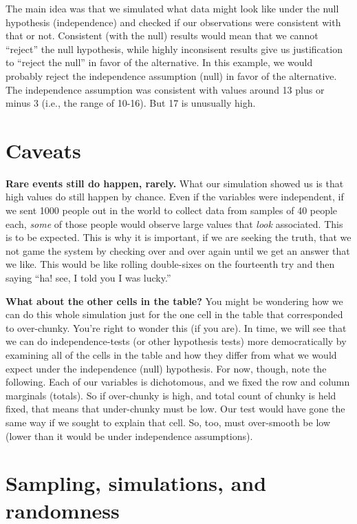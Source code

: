 \documentclass[openany]{book}
\begin{document}
The main idea was that we simulated what data might look like under the null hypothesis (independence) and checked if our observations were consistent with that or not. Consistent (with the null) results would mean that we cannot ``reject'' the null hypothesis, while highly inconsisent results give us justification to ``reject the null'' in favor of the alternative. In this example, we would probably reject the independence assumption (null) in favor of the alternative. The independence assumption was consistent with values around 13 plus or minus 3 (i.e., the range of 10-16). But 17 is unusually high.

\hypertarget{caveats}{%
\section*{Caveats}\label{caveats}}

\textbf{Rare events still do happen, rarely.} What our simulation showed us is that high values do still happen by chance. Even if the variables were independent, if we sent 1000 people out in the world to collect data from samples of 40 people each, \emph{some} of those people would observe large values that \emph{look} associated. This is to be expected. This is why it is important, if we are seeking the truth, that we not game the system by checking over and over again until we get an answer that we like. This would be like rolling double-sixes on the fourteenth try and then saying ``ha! see, I told you I was lucky.''

\textbf{What about the other cells in the table?} You might be wondering how we can do this whole simulation just for the one cell in the table that corresponded to over-chunky. You're right to wonder this (if you are). In time, we will see that we can do independence-tests (or other hypothesis tests) more democratically by examining all of the cells in the table and how they differ from what we would expect under the independence (null) hypothesis. For now, though, note the following. Each of our variables is dichotomous, and we fixed the row and column marginals (totals). So if over-chunky is high, and total count of chunky is held fixed, that means that under-chunky must be low. Our test would have gone the same way if we sought to explain that cell. So, too, must over-smooth be low (lower than it would be under independence assumptions).

\hypertarget{sampling-simulations-and-randomness}{%
\section*{Sampling, simulations, and randomness}\label{sampling-simulations-and-randomness}}
\end{document}
